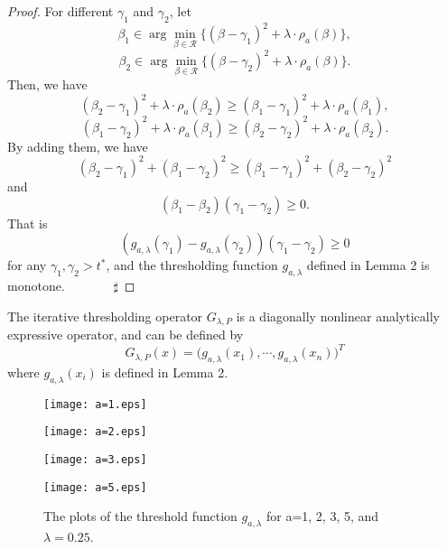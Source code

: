 \documentclass[smallextended]{svjour3}
\begin{document}
\begin{proof}
For different $\gamma_{1}$ and $\gamma_{2}$, let
$$\beta_{1}\in\displaystyle\arg\min_{\beta\in \mathcal{R}}\Big\{(\beta-\gamma_{1})^{2}+\lambda\cdot\rho_{a}(\beta)\Big\},$$
$$\beta_{2}\in\displaystyle\arg\min_{\beta\in \mathcal{R}}\Big\{(\beta-\gamma_{2})^{2}+\lambda\cdot\rho_{a}(\beta)\Big\}.$$
Then, we have
$$(\beta_{2}-\gamma_{1})^{2}+\lambda\cdot \rho_{a}(\beta_{2})\geq(\beta_{1}-\gamma_{1})^{2}+\lambda\cdot \rho_{a}(\beta_{1}),$$
$$(\beta_{1}-\gamma_{2})^{2}+\lambda\cdot \rho_{a}(\beta_{1})\geq(\beta_{2}-\gamma_{2})^{2}+\lambda\cdot \rho_{a}(\beta_{2}).$$
By adding them, we have
$$(\beta_{2}-\gamma_{1})^{2}+(\beta_{1}-\gamma_{2})^{2}\geq(\beta_{1}-\gamma_{1})^{2}+(\beta_{2}-\gamma_{2})^{2}$$
and
$$(\beta_{1}-\beta_{2})(\gamma_{1}-\gamma_{2})\geq0.$$
That is
$$(g_{a,\lambda}(\gamma_{1})-g_{a,\lambda}(\gamma_{2}))(\gamma_{1}-\gamma_{2})\geq0$$
for any $\gamma_{1}, \gamma_{2}>t^{\ast}$, and the thresholding function $g_{a,\lambda}$ defined in Lemma 2 is monotone. \ \ \ \ \ \ \ $\sharp$
\end{proof}

\begin{definition}\label{de1}
The iterative thresholding operator $G_{\lambda, P}$ is a diagonally nonlinear analytically expressive operator, and can be defined by
\begin{equation}\label{r23}
G_{\lambda, P}(x)=\Big(g_{a,\lambda}(x_{1}), \cdots, g_{a,\lambda}(x_{n})\Big)^{T}
\end{equation}
where $g_{a,\lambda}(x_{i})$ is defined in Lemma 2.
\end{definition}

\begin{figure}[h!]
  \begin{minipage}[t]{0.5\linewidth}
  \centering
  \texttt{[image: a=1.eps]}
  \end{minipage}
  \begin{minipage}[t]{0.5\linewidth}
  \centering
  \texttt{[image: a=2.eps]}
  \end{minipage}
   \begin{minipage}[t]{0.5\linewidth}
  \centering
  \texttt{[image: a=3.eps]}
  \end{minipage}
   \begin{minipage}[t]{0.5\linewidth}
  \centering
  \texttt{[image: a=5.eps]}
  \end{minipage}
  \caption{The plots of the threshold function $g_{a,\lambda}$ for a=1, 2, 3, 5, and $\lambda=0.25$.} \label{fig:2}
\end{figure}
\end{document}
